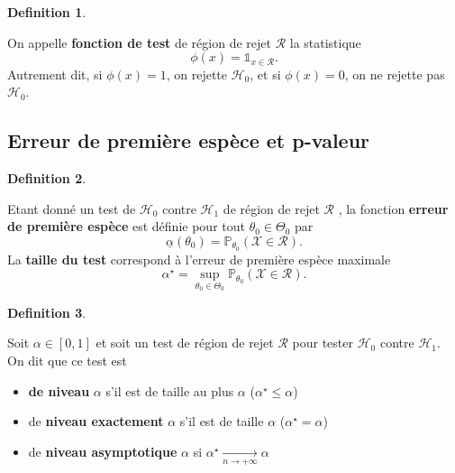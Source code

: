 \documentclass[
]{book}
\providecommand{\tightlist}{%
  \setlength{\itemsep}{0pt}\setlength{\parskip}{0pt}}
\theoremstyle{definition}
\newtheorem{definition}{Definition}[chapter]
\theoremstyle{definition}
\theoremstyle{definition}
\theoremstyle{definition}
\theoremstyle{remark}
\begin{document}
\begin{definition}
\protect\hypertarget{def:unlabeled-div-2}{}\label{def:unlabeled-div-2}

On appelle \textbf{fonction de test} de région de rejet \(\mathcal R\) la statistique
\[
\phi(x) = \mathbb{1}_{x\in \mathcal R}.
\]
Autrement dit, si \(\phi(x)=1\), on rejette \(\mathcal{H}_0\), et si \(\phi(x)=0\), on ne rejette pas \(\mathcal{H}_0\).

\end{definition}

\hypertarget{erreur-de-premiuxe8re-espuxe8ce-et-p-valeur}{%
\subsection{Erreur de première espèce et p-valeur}\label{erreur-de-premiuxe8re-espuxe8ce-et-p-valeur}}

\begin{definition}
\protect\hypertarget{def:unlabeled-div-3}{}\label{def:unlabeled-div-3}

Etant donné un test de \(\mathcal{H}_0\) contre \(\mathcal{H}_1\) de région de rejet \(\mathcal R\) , la fonction \textbf{erreur de première espèce} est définie pour tout \(\theta_0\in\Theta_0\) par
\[
\underline{\alpha}(\theta_0) = \mathbb{P}_{\theta_0}(\mathcal{X}\in \mathcal R).
\]
La \textbf{taille du test} correspond à l'erreur de première espèce maximale
\[
\alpha^{\star} = \sup_{\theta_0\in \Theta_0}\mathbb{P}_{\theta_0}\left(\mathcal{X}\in \mathcal R\right).
\]

\end{definition}

\begin{definition}
\protect\hypertarget{def:unlabeled-div-4}{}\label{def:unlabeled-div-4}

Soit \(\alpha\in[0,1]\) et soit un test de région de rejet \(\mathcal R\) pour tester \(\mathcal{H}_0\) contre \(\mathcal{H}_1\). On dit que ce test est

\begin{itemize}
\tightlist
\item
  \textbf{de niveau} \(\alpha\) s'il est de taille au plus \(\alpha\) (\(\alpha^{\star} \leq \alpha\))
\item
  de \textbf{niveau exactement} \(\alpha\) s'il est de taille \(\alpha\) (\(\alpha^{\star} = \alpha\))
\item
  de \textbf{niveau asymptotique} \(\alpha\) si \(\alpha^{\star} \underset{n\rightarrow +\infty}{\longrightarrow} \alpha\)
\end{itemize}

\end{definition}
\end{document}
